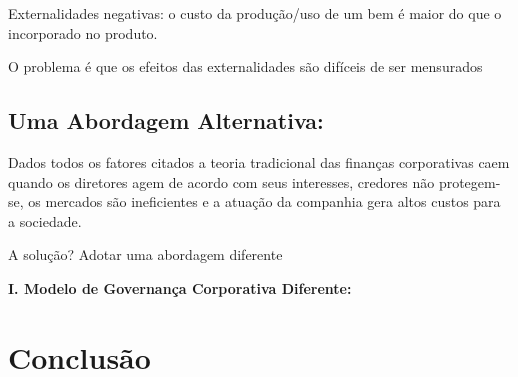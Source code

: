 Externalidades negativas: o custo da produção/uso de um bem é maior do que o incorporado no produto.

O problema é que os efeitos das externalidades são difíceis de ser mensurados

\subsection*{Uma Abordagem Alternativa:}
Dados todos os fatores citados a teoria tradicional das finanças corporativas caem quando os diretores agem de acordo com seus interesses, credores não protegem-se, os mercados são ineficientes e a atuação da companhia gera altos custos para a sociedade.

A solução? Adotar uma abordagem diferente

\textbf{I. Modelo de Governança Corporativa Diferente:} 
\section{Conclusão}
